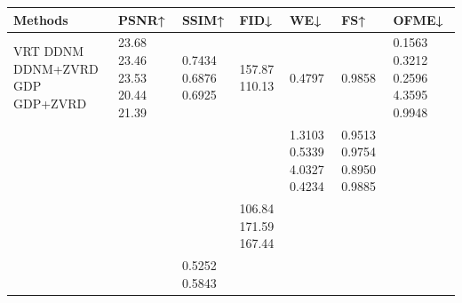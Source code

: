 \begin{tabular}{lllllll}
\toprule
Methods & PSNR↑ & SSIM↑ & FID↓ & WE↓ & FS↑ & OFME↓ \\
\midrule
VRT DDNM DDNM+ZVRD GDP GDP+ZVRD & 23.68 23.46 23.53 20.44 21.39 & 0.7434 0.6876 0.6925 & 157.87 110.13 & 0.4797 & 0.9858 & 0.1563 0.3212 0.2596 4.3595 0.9948 \\
 &  &  &  & 1.3103 0.5339 4.0327 0.4234 & 0.9513 0.9754 0.8950 0.9885 &  \\
 &  &  & 106.84 171.59 167.44 &  &  &  \\
 &  & 0.5252 0.5843 &  &  &  &  \\
\bottomrule
\end{tabular}
